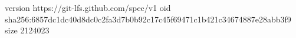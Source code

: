 version https://git-lfs.github.com/spec/v1
oid sha256:6857dc1dc40d8dc0c2fa3d7b0b92c17c45f69471c1b421c34674887e28abb3f9
size 2124023
